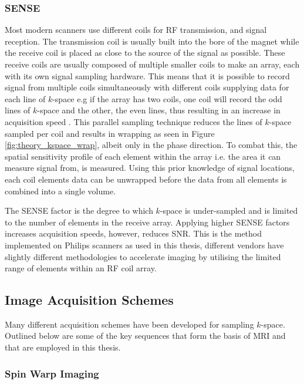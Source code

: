 \subsubsection{\ac*{SENSE}}
Most modern scanners use different coils for \ac{RF} transmission, and signal reception. The transmission coil is usually built into the bore of the magnet while the receive coil is placed as close to the source of the signal as possible. These receive coils are usually composed of multiple smaller coils to make an array, each with its own signal sampling hardware. This means that it is possible to record signal from multiple coils simultaneously with different coils supplying data for each line of $k$-space e.g if the array has two coils, one coil will record the odd lines of $k$-space and the other, the even lines, thus resulting in an increase in acquisition speed \cite{pruessmann_sense_1999}. This parallel sampling technique reduces the lines of $k$-space sampled per coil and results in wrapping as seen in Figure \ref{fig:theory_kspace_wrap}, albeit only in the phase direction. To combat this, the spatial sensitivity profile of each element within the array i.e. the area it can measure signal from, is measured. Using this prior knowledge of signal locations, each coil elements data can be unwrapped before the data from all elements is combined into a single volume.

The \ac{SENSE} factor is the degree to which $k$-space is under-sampled and is limited to the number of elements in the receive array. Applying higher \ac{SENSE} factors increases acquisition speeds, however, reduces \ac{SNR}. This is the method implemented on Philips scanners as used in this thesis, different vendors have slightly different methodologies to accelerate imaging by utilising the limited range of elements within an \ac{RF} coil array.

\subsection{Image Acquisition Schemes}

Many different acquisition schemes have been developed for sampling $k$-space. Outlined below are some of the key sequences that form the basis of \ac{MRI} and that are employed in this thesis.

\subsubsection{Spin Warp Imaging}

